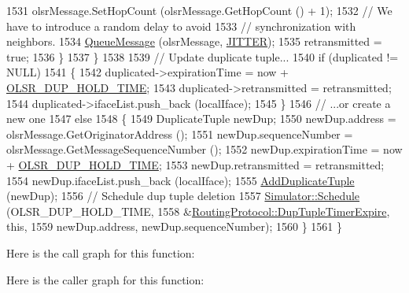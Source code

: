 \begin{DoxyCode}
1531           olsrMessage.SetHopCount (olsrMessage.GetHopCount () + 1);
1532           \textcolor{comment}{// We have to introduce a random delay to avoid}
1533           \textcolor{comment}{// synchronization with neighbors.}
1534           \hyperlink{classns3_1_1olsr_1_1RoutingProtocol_a206c7c0bba382cba1ac50d11a7df88f3}{QueueMessage} (olsrMessage, \hyperlink{olsr-routing-protocol_8cc_a06863e04dddc5f7fbbedb516974df4b3}{JITTER});
1535           retransmitted = \textcolor{keyword}{true};
1536         \}
1537     \}
1538 
1539   \textcolor{comment}{// Update duplicate tuple...}
1540   \textcolor{keywordflow}{if} (duplicated != NULL)
1541     \{
1542       duplicated->expirationTime = now + \hyperlink{olsr-routing-protocol_8cc_ab108121273061d42abc9819edccc06d2}{OLSR\_DUP\_HOLD\_TIME};
1543       duplicated->retransmitted = retransmitted;
1544       duplicated->ifaceList.push\_back (localIface);
1545     \}
1546   \textcolor{comment}{// ...or create a new one}
1547   \textcolor{keywordflow}{else}
1548     \{
1549       DuplicateTuple newDup;
1550       newDup.address = olsrMessage.GetOriginatorAddress ();
1551       newDup.sequenceNumber = olsrMessage.GetMessageSequenceNumber ();
1552       newDup.expirationTime = now + \hyperlink{olsr-routing-protocol_8cc_ab108121273061d42abc9819edccc06d2}{OLSR\_DUP\_HOLD\_TIME};
1553       newDup.retransmitted = retransmitted;
1554       newDup.ifaceList.push\_back (localIface);
1555       \hyperlink{classns3_1_1olsr_1_1RoutingProtocol_ad863ed4e771bfe7ee021892ddacd2691}{AddDuplicateTuple} (newDup);
1556       \textcolor{comment}{// Schedule dup tuple deletion}
1557       \hyperlink{classns3_1_1Simulator_a671882c894a08af4a5e91181bf1eec13}{Simulator::Schedule} (OLSR\_DUP\_HOLD\_TIME,
1558                            &\hyperlink{classns3_1_1olsr_1_1RoutingProtocol_a78f4aad4a5597ab60fa913e917eabbec}{RoutingProtocol::DupTupleTimerExpire}, \textcolor{keyword}{this},
1559                            newDup.address, newDup.sequenceNumber);
1560     \}
1561 \}
\end{DoxyCode}


Here is the call graph for this function\+:




Here is the caller graph for this function\+:


